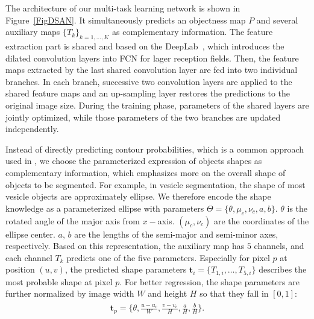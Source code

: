 The architecture of our multi-task learning network is shown in Figure~\ref{FigDSAN}.
It simultaneously predicts an objectness map $P$ and several auxiliary maps $\{T_k\}_{k=1,\ldots,K}$ as complementary information.
%
The feature extraction part is shared and based on the DeepLab~\cite{Chen2014a}, which introduces the dilated convolution layers into FCN for lager reception fields.
Then, the feature maps extracted by the last shared convolution layer are fed into two individual branches.
In each branch, successive two convolution layers are applied to the shared feature maps and an up-sampling layer restores the predictions to the original image size.
% 
During the training phase, parameters of the shared layers are jointly optimized, while those parameters of the two branches are updated independently.

Instead of directly predicting contour probabilities, which is a common approach used in \cite{Chen2017,Chen2016,Bertasius2016}, we choose the parameterized expression of objects shapes as complementary information, which emphasizes more on the overall shape of objects to be segmented.
%
For example, in vesicle segmentation, the shape of most vesicle objects are approximately ellipse. We therefore encode the shape knowledge as a parameterized ellipse with parameters $\Theta=\{\theta, \mu_c, \nu_c, a, b\}$.
$\theta$ is the rotated angle of the major axis from $x-$axis.
$(\mu_c, \nu_c)$ are the coordinates of the ellipse center.
$a$, $b$ are the lengths of the semi-major and semi-minor axes, respectively. 
Based on this representation, the auxiliary map has $5$ channels, and each channel $T_k$ predicts one of the five parameters.
%
Especially for pixel $p$ at position $(u,v)$, the predicted shape parameters $\mathbf{t}_i= \{T_{1,i},\ldots,T_{5,i}\}$ describes the most probable shape at pixel $p$.
%
For better regression, the shape parameters are further normalized by image width $W$ and height $H$ so that they fall in $[0,1]$:
\begin{eqnarray}\label{EqPara}
\begin{aligned}
\mathbf{t}_{p} = \{\theta,\frac{u-u_c}{W},\frac{v-v_c}{H},\frac{a}{H},\frac{b}{H}\}.
\end{aligned}
\end{eqnarray}

